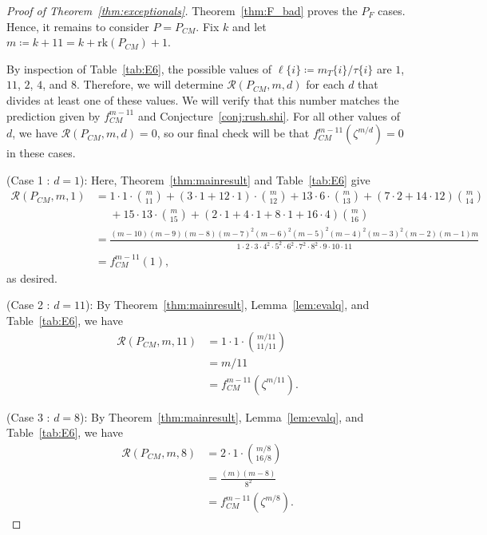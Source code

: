 \documentclass[12pt]{amsart}
\theoremstyle{definition}
\theoremstyle{remark}
\numberwithin{equation}{section}
\newcommand{\rank}{\ensuremath{\mathrm{rk}}}
\begin{document}
\begin{proof}[Proof of Theorem~\ref{thm:exceptionals}]
Theorem~\ref{thm:F_bad} proves the $P_F$ cases. Hence, it remains to consider $P = P_{CM}$.
Fix $k$ and let $m \coloneqq k +11   = k + \rank(P_{CM}) + 1$. 

By inspection of Table~\ref{tab:E6}, the possible values of $\ell\{i\} \coloneqq m_T\{i\}/\tau\{i\}$ are $1$, $11$, $2$, $4$, and $8$. Therefore, we will determine $\mathcal{R}(P_{CM},m,d)$ for each $d$ that divides at least one of these values. We will verify that this number matches the prediction given by $f^{m-11}_{CM}$ and Conjecture~\ref{conj:rush.shi}. For all other values of $d$, we have $\mathcal{R}(P_{CM},m,d) = 0$, so our final check will be that  $f^{m-11}_{CM}(\zeta^{m/d}) = 0$ in these cases.

\smallskip

\noindent
{\sf (Case 1 : $d = 1$)}:
Here, Theorem~\ref{thm:mainresult} and Table~\ref{tab:E6} give
\tiny
\begin{align*}
\mathcal{R}(P_{CM},m,1) &= 1 \cdot 1 \cdot \binom{m}{11} + (3 \cdot 1  + 12 \cdot 1)  \cdot \binom{m}{12} + 13 \cdot 6 \cdot \binom{m}{13} + (7\cdot 2 + 14 \cdot 12) \binom{m}{14}  \\ &\ \ \ \ \ \ + 15 \cdot 13 \cdot \binom{m}{15} + (2 \cdot 1 + 4 \cdot 1 + 8 \cdot 1 + 16 \cdot 4) \binom{m}{16} \\
&= \frac{(m-10)(m-9)(m-8)(m-7)^2(m-6)^2(m-5)^2(m-4)^2(m-3)^2(m-2)(m-1)m}{1\cdot 2\cdot 3\cdot 4^2 \cdot 5^2 \cdot 6^2 \cdot 7^2 \cdot 8^2 \cdot 9 \cdot 10 \cdot 11} \\
&= f_{CM}^{m-11}(1),
\end{align*}
\normalsize
as desired.

\smallskip
\noindent
{\sf (Case 2 : $d = 11$)}:
By Theorem~\ref{thm:mainresult}, Lemma~\ref{lem:evalq}, and Table~\ref{tab:E6}, we have
\begin{align*}
\mathcal{R}(P_{CM},m,11) &= 1 \cdot 1 \cdot \binom{m/11}{11/11} \\
&= m/11 \\ 
&= f_{CM}^{m-11}(\zeta^{m/11}).
\end{align*}

\smallskip
\noindent
{\sf (Case 3 : $d = 8$)}:
By Theorem~\ref{thm:mainresult}, Lemma~\ref{lem:evalq}, and Table~\ref{tab:E6}, we have
\begin{align*}
\mathcal{R}(P_{CM},m,8) &= 2 \cdot 1 \cdot \binom{m/8}{16/8} \\
&= \frac{(m)(m-8)}{8^2} \\
&= f_{CM}^{m-11}(\zeta^{m/8}).
\end{align*}


\end{proof}
\end{document}
